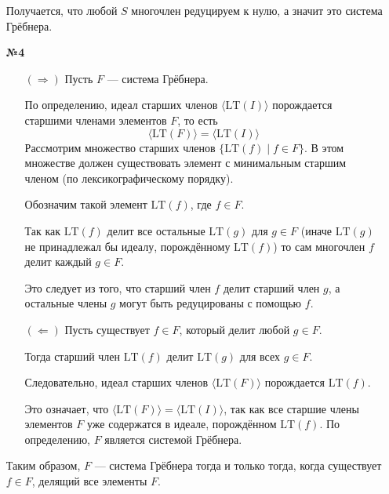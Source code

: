 \documentclass[a4paper]{article}
\begin{document}
\begin{enumerate}
  Получается, что любой $S$ многочлен редуцируем к нулю, а значит это система Грёбнера.

  \item[\textbf{№4}] 
  \begin{enumerate}
    \item[$(\Rightarrow)$]Пусть \( F \) — система Грёбнера. 
    
    По определению, идеал старших членов \( \langle \text{LT}(I) \rangle \) порождается старшими членами элементов \( F \), то есть 
    \[ \langle \text{LT}(F) \rangle = \langle \text{LT}(I) \rangle \]
    Рассмотрим множество старших членов \( \{\text{LT}(f) \mid f \in F\} \). 
    В этом множестве должен существовать элемент с минимальным старшим членом 
    (по лексикографическому порядку). 
    
    Обозначим такой элемент \( \text{LT}(f) \), где \( f \in F \). 
    
    Так как \( \text{LT}(f) \) делит все остальные \( \text{LT}(g) \) для \( g \in F \)
    (иначе \( \text{LT}(g) \) не принадлежал бы идеалу, порождённому \( \text{LT}(f) \))
    то сам многочлен \( f \) делит каждый \( g \in F \).
    
    Это следует из того, что старший член \( f \) делит старший член \( g \), 
    а остальные члены \( g \) могут быть редуцированы с помощью \( f \).\\

    \item[$(\Leftarrow)$]
    Пусть существует \( f \in F \), который делит любой \( g \in F \). 
    
    Тогда старший член \( \text{LT}(f) \) делит \( \text{LT}(g) \) для всех \( g \in F \).
    
    Следовательно, идеал старших членов \( \langle \text{LT}(F) \rangle \) 
    порождается \( \text{LT}(f) \). 
    
    Это означает, что \( \langle \text{LT}(F) \rangle = \langle \text{LT}(I) \rangle \),
      так как все старшие члены элементов \( F \) уже содержатся в идеале, 
      порождённом \( \text{LT}(f) \).
      По определению, \( F \) является системой Грёбнера.
  \end{enumerate}
  Таким образом, \( F \) — система Грёбнера тогда и только тогда, когда существует \( f \in F \), делящий все элементы \( F \).


\end{enumerate}
\end{document}
